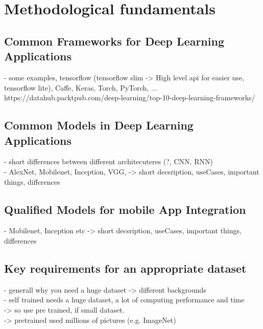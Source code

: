 \section{Methodological fundamentals}
	\subsection{Common Frameworks for Deep Learning Applications}
		- some examples, tensorflow (tensorflow slim -> High  level api for easier use, tensorflow lite), Caffe, Keras, Torch, PyTorch, ... \\
		https://datahub.packtpub.com/deep-learning/top-10-deep-learning-frameworks/ \\
	\subsection{Common Models in Deep Learning Applications}
		- short differences between different architecuteres (?, CNN, RNN) \\
 		- AlexNet, Mobilenet, Inception, VGG, -> short decsription, useCases, important things, differences \\
	\subsection{Qualified Models for mobile App Integration}
 		- Mobilenet, Inception etc -> short decsription, useCases, important things, differences \\
	\subsection{Key requirements for an appropriate dataset}
		- generall why you need a huge dataset -> different backgrounds \\
		- self trained needs a huge dataset, a lot of computing performance and time \\
		-> so use pre trained, if small dataset. \\
		-> pretrained used millions of pictures (e.g. ImageNet)
